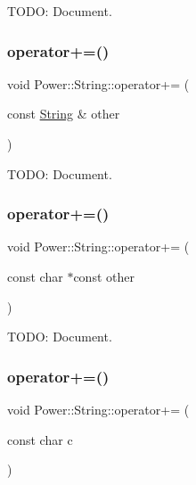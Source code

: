 T\+O\+DO\+: Document. 

\mbox{\label{class_power_1_1_string_aad7a34466104387cc33cafcf04770b39}} 
\subsubsection{\texorpdfstring{operator+=()}{operator+=()}\hspace{0.1cm}{\footnotesize\ttfamily [1/11]}}
{\footnotesize\ttfamily void Power\+::\+String\+::operator+= (\begin{DoxyParamCaption}\item[{const \hyperlink{class_power_1_1_string}{String} \&}]{other }\end{DoxyParamCaption})\hspace{0.3cm}{\ttfamily [inline]}}



T\+O\+DO\+: Document. 

\mbox{\label{class_power_1_1_string_a49e4abf34ef85a8d709aa0b6e37a283e}} 
\subsubsection{\texorpdfstring{operator+=()}{operator+=()}\hspace{0.1cm}{\footnotesize\ttfamily [2/11]}}
{\footnotesize\ttfamily void Power\+::\+String\+::operator+= (\begin{DoxyParamCaption}\item[{const char $\ast$const}]{other }\end{DoxyParamCaption})\hspace{0.3cm}{\ttfamily [inline]}}



T\+O\+DO\+: Document. 

\mbox{\label{class_power_1_1_string_a52dac2961382313c2817ae2186d09a9e}} 
\subsubsection{\texorpdfstring{operator+=()}{operator+=()}\hspace{0.1cm}{\footnotesize\ttfamily [3/11]}}
{\footnotesize\ttfamily void Power\+::\+String\+::operator+= (\begin{DoxyParamCaption}\item[{const char}]{c }\end{DoxyParamCaption})\hspace{0.3cm}{\ttfamily [inline]}}



